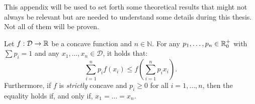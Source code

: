 This appendix will be used to set forth some theoretical results that might not always be relevant but are needed to understand some details during this thesis. Not all of them will be proven.

\begin{nprop}\label{prop:jensen}
    Let $f:\mathcal D \to \mathbb{R}$ be a concave function and $n\in \mathbb N$. For any $p_1,\dots,p_n \in \mathbb{R}^+_0$ with $\sum p_i = 1$ and any $x_1,\dots,x_n \in \mathcal D$, it holds that:
    $$
    \sum_{i = 1}^n p_i f(x_i) \leq f \left(\sum_{i=1}^n p_i x_i\right).
    $$
    Furthermore, if $f$ is \emph{strictly} concave and $p_i \geq 0$ for all $i  = 1,\dots,n$, then the equality holds if, and only if, $x_1 = \dots = x_n$.
\end{nprop}